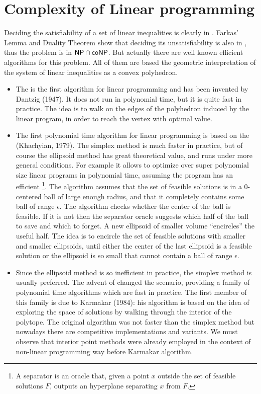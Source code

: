 \documentclass[a4paper,twoside,justified]{tufte-handout}
\begin{document}
\section{Complexity of Linear programming}

Deciding the satisfiability of a set of linear inequalities is clearly
in \NP.
% 
Farkas' Lemma and Duality Theorem show that deciding its
unsatisfiability is also in \NP, thus the problem is in $ \mathsf{NP} \cap \mathsf{coNP}
$. But actually there are well known efficient algorithms for this
problem. All of them are based the geometric interpretation of the
system of linear inequalities as a convex polyhedron.
\begin{itemize}
  \item The  is the first algorithm for
  linear programming and has been invented by Dantzig (1947). It does
  not run in polynomial time, but it is quite fast in practice. The
  idea is to walk on the edges of the polyhedron induced by the linear
  program, in order to reach the vertex with optimal value.
  \item The first polynomial time algorithm for linear programming is
  based on the  (Khachyian, 1979). The
  simplex method is much faster in practice, but of course the
  ellipsoid method has great theoretical value, and runs under more
  general conditions. For example it allows to optimize over super
  polynomial size linear programs in polynomial time, assuming the
  program has an efficient \footnote{A
    separator is an oracle that, given a point $x$ outside the set
    of feasible solutions $F$, outputs an hyperplane separating $ x$
    from $ F$.}.  The algorithm assumes that the set of feasible
  solutions is in a 0-centered ball of large enough radius, and that
  it completely contains some ball of range $ \epsilon $.
  The algorithm checks whether the center of the ball is feasible. If
  it is not then the separator oracle suggests which half of the ball
  to save and which to forget. A new ellipsoid of smaller volume
  ``encircles'' the useful half.  The idea is to encircle the set of
  feasible solutions with smaller and smaller ellipsoids, until either
  the center of the last ellipsoid is a feasible solution or the
  ellipsoid is so small that cannot contain a ball of range $ \epsilon
  $.
  
  \item Since the ellipsoid method is so inefficient in practice, the
  simplex method is usually preferred. The advent of
   changed the scenario,
  providing a family of polynomial time algorithms which are fast in
  practice. The first member of this family is due to Karmakar (1984):
  his algorithm is based on the idea of exploring the space of
  solutions by walking through the interior of the polytope. The
  original algorithm was not faster than the simplex method but
  nowadays there are competitive implementations and variants. We must
  observe that interior point methods were already employed in the
  context of non-linear programming way before Karmakar algorithm.
\end{itemize}
\end{document}

